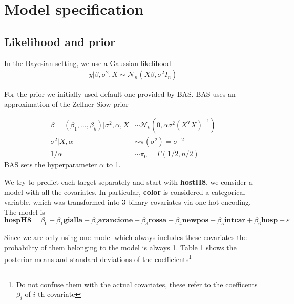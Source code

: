 \documentclass[12pt,a4paper]{article}
\theoremstyle{definition}
\theoremstyle{remark}
\begin{document}
\clearpage




\section{Model specification}
\subsection{Likelihood and prior}
In the Bayesian setting, we use a Gaussian likelihood 
\begin{align*}
	y|\beta,\sigma^2,X \sim \mathcal{N}_n(X\beta,\sigma^2I_n)
\end{align*}

For the prior we initially used default one provided by BAS. BAS uses an approximation of the Zellner-Siow prior 

	\begin{align*}
	\beta = (\beta_1, \dots, \beta_k)|\sigma^2, \alpha, X &\sim \mathcal{N}_k(0, \alpha\sigma^2(X^TX)^{-1}) \\
	\sigma^2|X,\alpha &\sim \pi(\sigma^2) = \sigma^{-2} \\
	1/\alpha &\sim \pi_0 = \Gamma(1/2, n/2)
\end{align*}
BAS sets the hyperparameter $\alpha$ to 1. 

We try to predict each target separately and start with \textbf{hostH8}, we consider a model with all the covariates. In particular, \textbf{color} is considered a categorical variable, which was transformed into 3 binary covariates via one-hot encoding. The model is
\begin{dmath*}
	\textbf{hospH8} = \beta_0 + \beta_1\textbf{gialla} + \beta_2\textbf{arancione} + \beta_3\textbf{rossa} + \beta_4\textbf{newpos} + \beta_5\textbf{intcar} + \beta_6\textbf{hosp} +  \varepsilon
\end{dmath*}

Since we are only using one model which always includes these covariates the probability of them belonging to the model is always 1.  Table 1 shows the posterior means and standard deviations of the coefficients\footnote{Do not confuse them with the actual covariates, these refer to the coefficents $\beta_i$ of $i$-th covariate}
\end{document}
